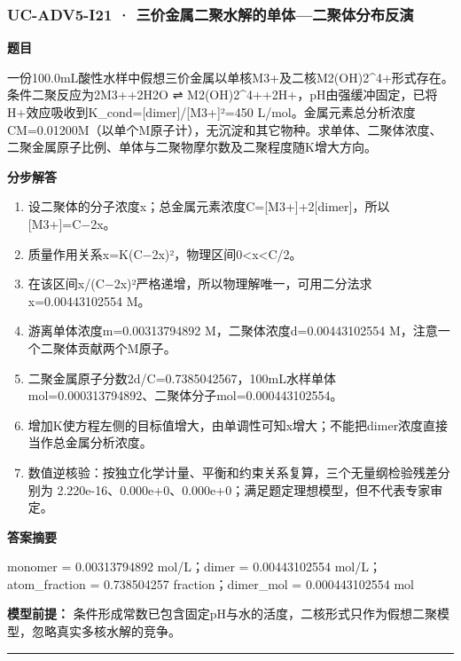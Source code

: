 \documentclass[UTF8,11pt,a4paper]{ctexart}
\begin{document}
\subsubsection*{UC-ADV5-I21 · 三价金属二聚水解的单体—二聚体分布反演}
\noindent\textbf{题目}\par
一份100.0mL酸性水样中假想三价金属以单核M3+及二核M2(OH)2\textasciicircum{}4+形式存在。条件二聚反应为2M3++2H2O ⇌ M2(OH)2\textasciicircum{}4++2H+，pH由强缓冲固定，已将H+效应吸收到K\_cond=[dimer]/[M3+]²=450 L/mol。金属元素总分析浓度CM=0.01200M（以单个M原子计），无沉淀和其它物种。求单体、二聚体浓度、二聚金属原子比例、单体与二聚物摩尔数及二聚程度随K增大方向。\par
\medskip\noindent\textbf{分步解答}
\begin{enumerate}
\item 设二聚体的分子浓度x；总金属元素浓度C=[M3+]+2[dimer]，所以[M3+]=C−2x。
\item 质量作用关系x=K(C−2x)²，物理区间0<x<C/2。
\item 在该区间x/(C−2x)²严格递增，所以物理解唯一，可用二分法求x=0.00443102554 M。
\item 游离单体浓度m=0.00313794892 M，二聚体浓度d=0.00443102554 M，注意一个二聚体贡献两个M原子。
\item 二聚金属原子分数2d/C=0.7385042567，100mL水样单体mol=0.000313794892、二聚体分子mol=0.000443102554。
\item 增加K使方程左侧的目标值增大，由单调性可知x增大；不能把dimer浓度直接当作总金属分析浓度。
\item 数值逆核验：按独立化学计量、平衡和约束关系复算，三个无量纲检验残差分别为 2.220e-16、0.000e+0、0.000e+0；满足题定理想模型，但不代表专家审定。
\end{enumerate}
\noindent\textbf{答案摘要}\par
monomer = 0.00313794892 mol/L；dimer = 0.00443102554 mol/L；atom\_fraction = 0.738504257 fraction；dimer\_mol = 0.000443102554 mol\par
\noindent\textbf{模型前提：}
条件形成常数已包含固定pH与水的活度，二核形式只作为假想二聚模型，忽略真实多核水解的竞争。\par
\medskip\hrule\medskip
{}
\end{document}
